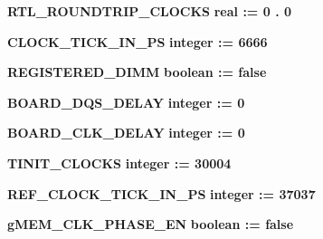 \begin{DoxyCompactItemize}
\item 
{\bf R\+T\+L\+\_\+\+R\+O\+U\+N\+D\+T\+R\+I\+P\+\_\+\+C\+L\+O\+C\+KS} {\bfseries {\bfseries \textcolor{comment}{real}\textcolor{vhdlchar}{ }\textcolor{vhdlchar}{ }\textcolor{vhdlchar}{\+:}\textcolor{vhdlchar}{=}\textcolor{vhdlchar}{ }\textcolor{vhdlchar}{ } \textcolor{vhdldigit}{0} \textcolor{vhdlchar}{.} \textcolor{vhdldigit}{0} \textcolor{vhdlchar}{ }}} 
\item 
{\bf C\+L\+O\+C\+K\+\_\+\+T\+I\+C\+K\+\_\+\+I\+N\+\_\+\+PS} {\bfseries {\bfseries \textcolor{comment}{integer}\textcolor{vhdlchar}{ }\textcolor{vhdlchar}{ }\textcolor{vhdlchar}{\+:}\textcolor{vhdlchar}{=}\textcolor{vhdlchar}{ }\textcolor{vhdlchar}{ } \textcolor{vhdldigit}{6666} \textcolor{vhdlchar}{ }}} 
\item 
{\bf R\+E\+G\+I\+S\+T\+E\+R\+E\+D\+\_\+\+D\+I\+MM} {\bfseries {\bfseries \textcolor{comment}{boolean}\textcolor{vhdlchar}{ }\textcolor{vhdlchar}{ }\textcolor{vhdlchar}{\+:}\textcolor{vhdlchar}{=}\textcolor{vhdlchar}{ }\textcolor{vhdlchar}{ }\textcolor{vhdlchar}{ }\textcolor{vhdlchar}{ }\textcolor{vhdlchar}{false}\textcolor{vhdlchar}{ }}} 
\item 
{\bf B\+O\+A\+R\+D\+\_\+\+D\+Q\+S\+\_\+\+D\+E\+L\+AY} {\bfseries {\bfseries \textcolor{comment}{integer}\textcolor{vhdlchar}{ }\textcolor{vhdlchar}{ }\textcolor{vhdlchar}{\+:}\textcolor{vhdlchar}{=}\textcolor{vhdlchar}{ }\textcolor{vhdlchar}{ } \textcolor{vhdldigit}{0} \textcolor{vhdlchar}{ }}} 
\item 
{\bf B\+O\+A\+R\+D\+\_\+\+C\+L\+K\+\_\+\+D\+E\+L\+AY} {\bfseries {\bfseries \textcolor{comment}{integer}\textcolor{vhdlchar}{ }\textcolor{vhdlchar}{ }\textcolor{vhdlchar}{\+:}\textcolor{vhdlchar}{=}\textcolor{vhdlchar}{ }\textcolor{vhdlchar}{ } \textcolor{vhdldigit}{0} \textcolor{vhdlchar}{ }}} 
\item 
{\bf T\+I\+N\+I\+T\+\_\+\+C\+L\+O\+C\+KS} {\bfseries {\bfseries \textcolor{comment}{integer}\textcolor{vhdlchar}{ }\textcolor{vhdlchar}{ }\textcolor{vhdlchar}{\+:}\textcolor{vhdlchar}{=}\textcolor{vhdlchar}{ }\textcolor{vhdlchar}{ } \textcolor{vhdldigit}{30004} \textcolor{vhdlchar}{ }}} 
\item 
{\bf R\+E\+F\+\_\+\+C\+L\+O\+C\+K\+\_\+\+T\+I\+C\+K\+\_\+\+I\+N\+\_\+\+PS} {\bfseries {\bfseries \textcolor{comment}{integer}\textcolor{vhdlchar}{ }\textcolor{vhdlchar}{ }\textcolor{vhdlchar}{\+:}\textcolor{vhdlchar}{=}\textcolor{vhdlchar}{ }\textcolor{vhdlchar}{ } \textcolor{vhdldigit}{37037} \textcolor{vhdlchar}{ }}} 
\item 
{\bf g\+M\+E\+M\+\_\+\+C\+L\+K\+\_\+\+P\+H\+A\+S\+E\+\_\+\+EN} {\bfseries {\bfseries \textcolor{comment}{boolean}\textcolor{vhdlchar}{ }\textcolor{vhdlchar}{ }\textcolor{vhdlchar}{\+:}\textcolor{vhdlchar}{=}\textcolor{vhdlchar}{ }\textcolor{vhdlchar}{ }\textcolor{vhdlchar}{ }\textcolor{vhdlchar}{ }\textcolor{vhdlchar}{false}\textcolor{vhdlchar}{ }}} 

\end{DoxyCompactItemize}
